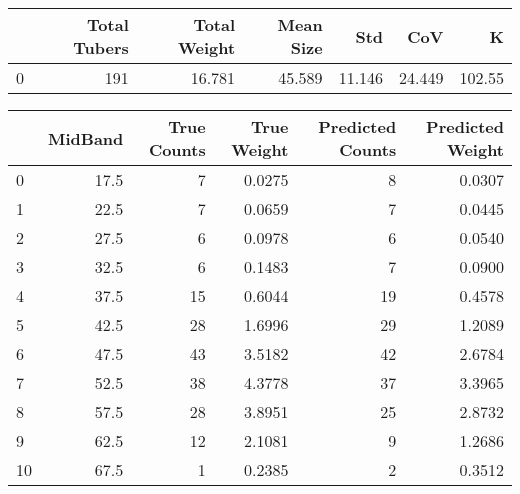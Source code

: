\begin{tabular}{lrrrrrr}
\toprule
{} &  Total Tubers &  Total Weight &  Mean Size &     Std &     CoV &       K \\
\midrule
0 &           191 &        16.781 &     45.589 &  11.146 &  24.449 &  102.55 \\
\bottomrule
\end{tabular}

\begin{tabular}{lrrrrr}
\toprule
{} &  MidBand &  True Counts &  True Weight &  Predicted Counts &  Predicted Weight \\
\midrule
0  &     17.5 &            7 &       0.0275 &                 8 &            0.0307 \\
1  &     22.5 &            7 &       0.0659 &                 7 &            0.0445 \\
2  &     27.5 &            6 &       0.0978 &                 6 &            0.0540 \\
3  &     32.5 &            6 &       0.1483 &                 7 &            0.0900 \\
4  &     37.5 &           15 &       0.6044 &                19 &            0.4578 \\
5  &     42.5 &           28 &       1.6996 &                29 &            1.2089 \\
6  &     47.5 &           43 &       3.5182 &                42 &            2.6784 \\
7  &     52.5 &           38 &       4.3778 &                37 &            3.3965 \\
8  &     57.5 &           28 &       3.8951 &                25 &            2.8732 \\
9  &     62.5 &           12 &       2.1081 &                 9 &            1.2686 \\
10 &     67.5 &            1 &       0.2385 &                 2 &            0.3512 \\
\bottomrule
\end{tabular}
